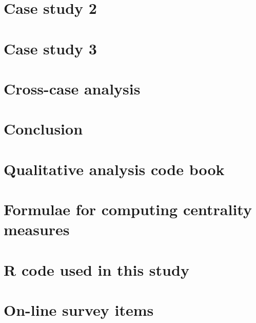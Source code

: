 \documentclass[12pt,twoside]{report}
\begin{document}
\chapter{Case study 2}


\chapter{Case study 3}


\chapter{Cross-case analysis}


\chapter{Conclusion}


\pagebreak




\appendix
\chapter{Qualitative analysis code book}


\chapter{Formulae for computing centrality measures}


\chapter{R code used in this study}


\chapter{On-line survey items}
% 
\end{document}
